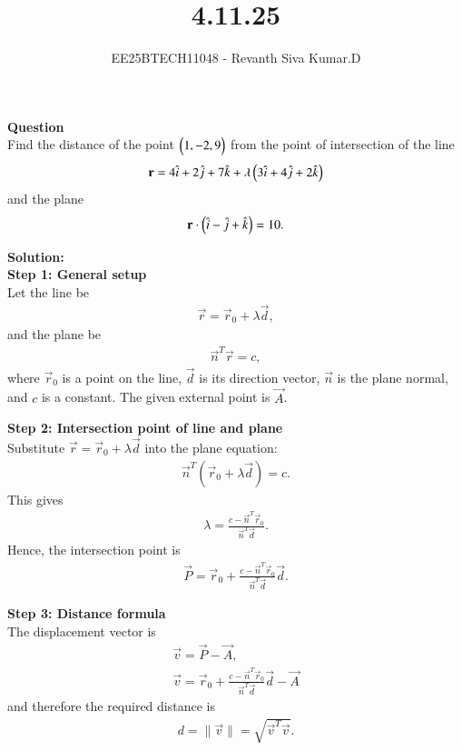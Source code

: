\documentclass[journal]{IEEEtran}
\begin{document}

\vspace{3cm}

\title{4.11.25}
\author{EE25BTECH11048 - Revanth Siva Kumar.D}
{\let\newpage\relax\maketitle}

\textbf{Question} \\
Find the distance of the point $\begin{pmatrix}1,-2,9\end{pmatrix}$ from the point of intersection of the line
\[
\mathbf{r} = 4\hat{i} + 2\hat{j} + 7\hat{k} + \lambda \begin{pmatrix}3\hat{i} + 4\hat{j} + 2\hat{k}\end{pmatrix}
\]
and the plane
\[
\mathbf{r}\cdot\begin{pmatrix}\hat{i} - \hat{j} + \hat{k}\end{pmatrix} = 10.
\]

\textbf{Solution:} \\

\textbf{Step 1: General setup} \\
Let the line be
\begin{align}
    \vec{r} = \vec{r}_0 + \lambda \vec{d},
\end{align}
and the plane be
\begin{align}
    \vec{n}^T \vec{r} = c,
\end{align}
where $\vec{r}_0$ is a point on the line, $\vec{d}$ is its direction vector, $\vec{n}$ is the plane normal, and $c$ is a constant.  
The given external point is $\vec{A}$.

\textbf{Step 2: Intersection point of line and plane} \\
Substitute $\vec{r}=\vec{r}_0+\lambda\vec{d}$ into the plane equation:
\begin{align}
    \vec{n}^T(\vec{r}_0+\lambda \vec{d}) = c.
\end{align}
This gives
\begin{align}
    \lambda = \frac{c - \vec{n}^T\vec{r}_0}{\vec{n}^T \vec{d}}.
\end{align}
Hence, the intersection point is
\begin{align}
    \vec{P} = \vec{r}_0 + \frac{c - \vec{n}^T\vec{r}_0}{\vec{n}^T\vec{d}} \vec{d}.
\end{align}

\textbf{Step 3: Distance formula} \\
The displacement vector is
\begin{align}
    \vec{v} = \vec{P} - \vec{A},\\
    \vec{v}=\vec{r}_0 + \frac{c - \vec{n}^T\vec{r}_0}{\vec{n}^T\vec{d}} \vec{d} - \vec{A}
\end{align}
and therefore the required distance is
\begin{align}
    d = \|\vec{v}\| = \sqrt{\vec{v}^T\vec{v}}.
\end{align}
\end{document}
